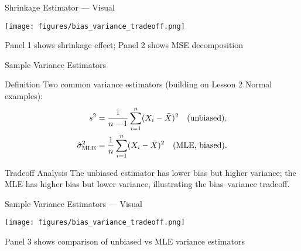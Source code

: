 \begin{frame}{Shrinkage Estimator --- Visual}
  \begin{center}
    \texttt{[image: figures/bias\_variance\_tradeoff.png]}
  \end{center}
  \vspace{-0.3cm}
  \footnotesize Panel 1 shows shrinkage effect; Panel 2 shows MSE decomposition
\end{frame}

\begin{frame}{Sample Variance Estimators}
  \begin{block}{Definition}
    Two common variance estimators (building on Lesson 2 Normal examples):
    \begin{align*}
    s^2 &= \frac{1}{n-1} \sum_{i=1}^n (X_i - \bar{X})^2 \quad (\text{unbiased}), \\
    \hat{\sigma}^2_{\text{MLE}} &= \frac{1}{n} \sum_{i=1}^n (X_i - \bar{X})^2 \quad (\text{MLE, biased}).
    \end{align*}
  \end{block}

  \begin{block}{Tradeoff Analysis}
    The unbiased estimator has lower bias but higher variance; the MLE has
    higher bias but lower variance, illustrating the bias--variance tradeoff.
  \end{block}
\end{frame}

\begin{frame}{Sample Variance Estimators --- Visual}
  \begin{center}
    \texttt{[image: figures/bias\_variance\_tradeoff.png]}
  \end{center}
  \vspace{-0.3cm}
  \footnotesize Panel 3 shows comparison of unbiased vs MLE variance estimators
\end{frame}

